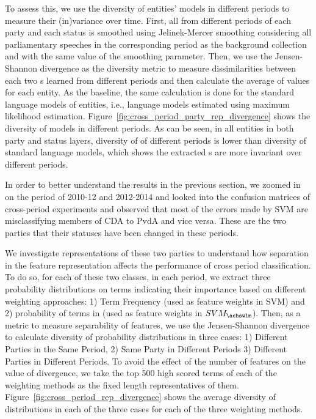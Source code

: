 To assess this, we use the diversity of entities' models in different periods to measure their (in)variance over time.
%
First, all \achswlm from different periods of each party and each status is smoothed using Jelinek-Mercer smoothing \citep{Zhai:2001} considering all parliamentary speeches in the corresponding period as the background collection and with the same value of the smoothing parameter. Then, we use the Jensen-Shannon divergence as the diversity metric to measure dissimilarities between each two {\achswlm}s learned from different periods and then calculate the average of values for each entity. As the baseline, the same calculation is done for the standard language models of entities, i.e., language models estimated using maximum likelihood estimation. 
Figure~\ref{fig:cross_period_party_rep_divergence} shows the diversity of models in different periods.
%
As can be seen, in all entities in both party and status layers, diversity of \achswlm of different periods is lower than diversity of standard language models, which shows the extracted {\achswlm}s are more invariant over different periods. 


In order to better understand the results in the previous section, we zoomed in on the period of 2010-12 and 2012-2014 and looked into the confusion matrices of cross-period experiments and observed that most of the errors made by SVM are misclassifying members of CDA to PvdA and vice versa. These are the two parties that their statuses have been changed in these periods.  


We investigate representations of these two parties to understand how separation in the feature representation affects the performance of cross period classification. To do so, for each of these two classes, in each period, we extract three probability distributions on terms indicating their importance based on different weighting approaches: 1) Term Frequency (used as feature weights in SVM) and 2) probability of terms in \achswlm (used as feature weights in $SVM_{\achswlm}$). 
Then, as a metric to measure separability of features, we use the Jensen-Shannon divergence to calculate diversity of probability distributions in three cases: 1) Different Parties in the Same Period, 2) Same Party in Different Periods 3) Different Parties in Different Periods. 
To avoid the effect of the number of features on the value of divergence, we take the top 500 high scored terms of each of the weighting methods as the fixed length representatives of them. Figure~\ref{fig:cross_period_rep_divergence} shows the average diversity of distributions in each of the three cases for each of the three weighting methods.

